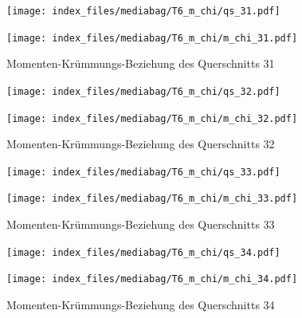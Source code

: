 \documentclass[
  11pt,
  letterpaper,
]{scrreprt}
\begin{document}
\begin{figure}[H]

\begin{minipage}{0.50\linewidth}
\texttt{[image: index\_files/mediabag/T6\_m\_chi/qs\_31.pdf]}\end{minipage}%
%
\begin{minipage}{0.50\linewidth}
\texttt{[image: index\_files/mediabag/T6\_m\_chi/m\_chi\_31.pdf]}\end{minipage}%

\caption{\label{fig-mchi_anhang}Momenten-Krümmungs-Beziehung des
Querschnitts 31}

\end{figure}%

\begin{figure}[H]

\begin{minipage}{0.50\linewidth}
\texttt{[image: index\_files/mediabag/T6\_m\_chi/qs\_32.pdf]}\end{minipage}%
%
\begin{minipage}{0.50\linewidth}
\texttt{[image: index\_files/mediabag/T6\_m\_chi/m\_chi\_32.pdf]}\end{minipage}%

\caption{\label{fig-mchi_anhang}Momenten-Krümmungs-Beziehung des
Querschnitts 32}

\end{figure}%

\begin{figure}[H]

\begin{minipage}{0.50\linewidth}
\texttt{[image: index\_files/mediabag/T6\_m\_chi/qs\_33.pdf]}\end{minipage}%
%
\begin{minipage}{0.50\linewidth}
\texttt{[image: index\_files/mediabag/T6\_m\_chi/m\_chi\_33.pdf]}\end{minipage}%

\caption{\label{fig-mchi_anhang}Momenten-Krümmungs-Beziehung des
Querschnitts 33}

\end{figure}%

\begin{figure}[H]

\begin{minipage}{0.50\linewidth}
\texttt{[image: index\_files/mediabag/T6\_m\_chi/qs\_34.pdf]}\end{minipage}%
%
\begin{minipage}{0.50\linewidth}
\texttt{[image: index\_files/mediabag/T6\_m\_chi/m\_chi\_34.pdf]}\end{minipage}%

\caption{\label{fig-mchi_anhang}Momenten-Krümmungs-Beziehung des
Querschnitts 34}

\end{figure}%
\end{document}
